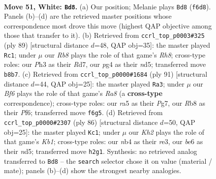 \documentclass[11pt]{article}
\begin{document}
\clearpage

\begin{figure}[p]\centering
\begin{subfigure}{0.46\textwidth}\centering
\resizebox{\linewidth}{!}{%
\newchessgame
\chessboard[
  setfen={1R6/5k2/2r1bB2/rp6/1n4p1/4P1PP/4RP1K/8 w - - 2 51},
  showmover=false,
  pgfstyle=straightmove, color=movearrow, markmove={f6-d8}
]}
\caption{}
\end{subfigure}\hfill
\begin{subfigure}{0.46\textwidth}\centering
\resizebox{\linewidth}{!}{%
\newchessgame
\chessboard[
  setfen={6R1/kp1r4/p7/3N3R/1P1p3P/3K4/2P2b2/7r b - - 6 45},
  showmover=false,
  pgfstyle=straightmove, color=movearrow, markmove={h1-c1}
]}
\caption{}
\end{subfigure}
\\[4pt]
\begin{subfigure}{0.46\textwidth}\centering
\resizebox{\linewidth}{!}{%
\newchessgame
\chessboard[
  setfen={3r4/6p1/2p2pk1/8/p7/1PB2P2/7P/r1N1R2K b - - 0 46},
  showmover=false,
  pgfstyle=straightmove, color=movearrow, markmove={a1-a3}
]}
\caption{}
\end{subfigure}\hfill
\begin{subfigure}{0.46\textwidth}\centering
\resizebox{\linewidth}{!}{%
\newchessgame
\chessboard[
  setfen={8/5k2/2R3p1/3nb1B1/p4p2/PP2r3/2P5/1K5R w - - 1 44},
  showmover=false,
  pgfstyle=straightmove, color=movearrow, markmove={b1-c1}
]}
\caption{}
\end{subfigure}
\caption{\textbf{Move 51, White: \texttt{Bd8}.} (a) Our position; Melanie plays \texttt{Bd8} (\texttt{f6d8}). Panels (b)--(d) are the retrieved master positions whose correspondence most drove this move (highest QAP objective among those that transfer to it). (b) Retrieved from \texttt{ccrl\_top\_p0003\#325} (ply 89) [structural distance $d$=48, QAP obj=35]: the master played \texttt{Rc1}; under $\mu$ our \emph{Rb8} plays the role of that game's \emph{Rh8}; cross-type roles: our \emph{P}h3 as their \emph{R}d7, our \emph{p}g4 as their \emph{n}d5; transferred move \texttt{b8b7}. (c) Retrieved from \texttt{ccrl\_top\_p0000\#1684} (ply 91) [structural distance $d$=44, QAP obj=25]: the master played \texttt{Ra3}; under $\mu$ our \emph{Bf6} plays the role of that game's \emph{Ra8} (a \textbf{cross-type} correspondence); cross-type roles: our \emph{r}a5 as their \emph{P}g7, our \emph{R}b8 as their \emph{P}f6; transferred move \texttt{f6g5}. (d) Retrieved from \texttt{ccrl\_top\_p0000\#2307} (ply 86) [structural distance $d$=50, QAP obj=25]: the master played \texttt{Kc1}; under $\mu$ our \emph{Kh2} plays the role of that game's \emph{Kb1}; cross-type roles: our \emph{n}b4 as their \emph{r}e3, our \emph{b}e6 as their \emph{n}d5; transferred move \texttt{h2g1}. Synthesis: no retrieved analog transferred to \texttt{Bd8} -- the \texttt{search} selector chose it on value (material / mate); panels (b)--(d) show the strongest nearby analogies.}
\label{fig:thought-m100}
\end{figure}
\end{document}
